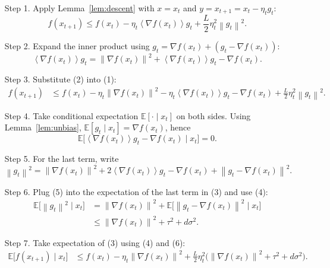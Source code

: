 \documentclass{article}
\newcommand{\E}{\mathbb{E}}
\newcommand{\norm}[1]{\left\|#1\right\|}
\newcommand{\inner}[1]{\left\langle#1\right\rangle}
\begin{document}
\begin{enumerate}
\item[Step 1.]  Apply Lemma~\ref{lem:descent} with $x=x_{t}$ and $y=x_{t+1}=x_{t}-\eta_{t}g_{t}$:
\[
f(x_{t+1})\le f(x_{t})-\eta_{t}\inner{\nabla f(x_{t})}{g_{t}}
               +\frac{L}{2}\eta_{t}^{2}\norm{g_{t}}^{2}.
\tag{1}
\]

\item[Step 2.]  Expand the inner product using $g_{t}= \nabla f(x_{t})+(g_{t}-\nabla f(x_{t}))$:
\[
\inner{\nabla f(x_{t})}{g_{t}}
= \norm{\nabla f(x_{t})}^{2}
  +\inner{\nabla f(x_{t})}{g_{t}-\nabla f(x_{t})}.
\tag{2}
\]

\item[Step 3.]  Substitute (2) into (1):
\[
\begin{aligned}
f(x_{t+1})
&\le f(x_{t})-\eta_{t}\norm{\nabla f(x_{t})}^{2}
   -\eta_{t}\inner{\nabla f(x_{t})}{g_{t}-\nabla f(x_{t})}
   +\frac{L}{2}\eta_{t}^{2}\norm{g_{t}}^{2}.
\end{aligned}
\tag{3}
\]

\item[Step 4.]  Take conditional expectation $\E[\cdot\mid x_{t}]$ on both sides.
Using Lemma~\ref{lem:unbias}, $\E[g_{t}\mid x_{t}]=\nabla f(x_{t})$, hence
\[
\E\!\big[\inner{\nabla f(x_{t})}{g_{t}-\nabla f(x_{t})}\mid x_{t}\big]=0.
\tag{4}
\]

\item[Step 5.]  For the last term, write
\[
\norm{g_{t}}^{2}
= \norm{\nabla f(x_{t})}^{2}
  +2\inner{\nabla f(x_{t})}{g_{t}-\nabla f(x_{t})}
  +\norm{g_{t}-\nabla f(x_{t})}^{2}.
\tag{5}
\]

\item[Step 6.]  Plug (5) into the expectation of the last term in (3) and use (4):
\[
\begin{aligned}
\E\!\big[\norm{g_{t}}^{2}\mid x_{t}\big]
&= \norm{\nabla f(x_{t})}^{2}
   +\E\!\big[\norm{g_{t}-\nabla f(x_{t})}^{2}\mid x_{t}\big] \\
&\le \norm{\nabla f(x_{t})}^{2}+ \tau^{2}+d\sigma^{2}.
\end{aligned}
\tag{6}
\]

\item[Step 7.]  Take expectation of (3) using (4) and (6):
\[
\begin{aligned}
\E\!\big[f(x_{t+1})\mid x_{t}\big]
&\le f(x_{t})
   -\eta_{t}\norm{\nabla f(x_{t})}^{2}
   +\frac{L}{2}\eta_{t}^{2}
     \Big(\norm{\nabla f(x_{t})}^{2}+ \tau^{2}+d\sigma^{2}\Big).
\end{aligned}
\tag{7}
\]


\end{enumerate}
\end{document}
